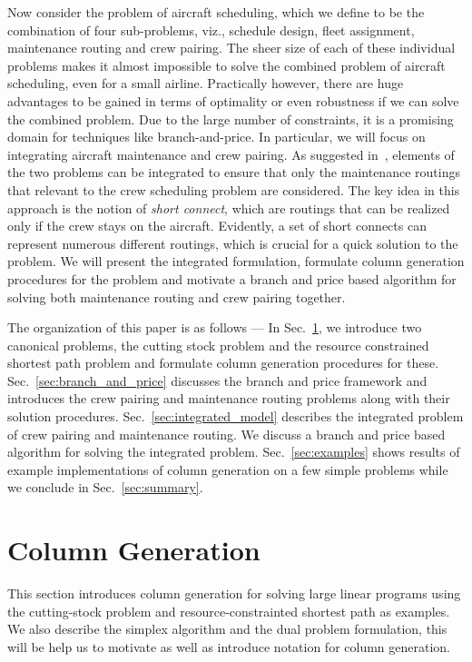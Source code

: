\documentclass[letterpaper, 10pt, twocolumn, reqno]{amsart}
\begin{document}
Now consider the problem of aircraft scheduling, which we define to be the combination of four sub-problems, viz., schedule design, fleet assignment, maintenance routing and crew pairing. The sheer size of each of these individual problems makes it almost impossible to solve the combined problem of aircraft scheduling, even for a small airline. Practically however, there are huge advantages to be gained in terms of optimality or even robustness if we can solve the combined problem. Due to the large number of constraints, it is a promising domain for techniques like branch-and-price. In particular, we will focus on integrating aircraft maintenance and crew pairing. As suggested in~\cite{cohn2003improving}, elements of the two problems can be integrated to ensure that only the maintenance routings that relevant to the crew scheduling problem are considered. The key idea in this approach is the notion of \emph{short connect}, which are routings that can be realized only if the crew stays on the aircraft. Evidently, a set of short connects can represent numerous different routings, which is crucial for a quick solution to the problem. We will present the integrated formulation, formulate column generation procedures for the problem and motivate a branch and price based algorithm for solving both maintenance routing and crew pairing together.

The organization of this paper is as follows --- In Sec.~\ref{sec:column_generation}, we introduce two canonical problems, the cutting stock problem and the resource constrained shortest path problem and formulate column generation procedures for these. Sec.~\ref{sec:branch_and_price} discusses the branch and price framework and introduces the crew pairing and maintenance routing problems along with their solution procedures. Sec.~\ref{sec:integrated_model} describes the integrated problem of crew pairing and maintenance routing. We discuss a branch and price based algorithm for solving the integrated problem. Sec.~\ref{sec:examples} shows results of example implementations of column generation on a few simple problems while we conclude in Sec.~\ref{sec:summary}.

\section{Column Generation}
\label{sec:column_generation}

This section introduces column generation for solving large linear programs using the cutting-stock problem and resource-constrainted shortest path as examples. We also describe the simplex algorithm and the dual problem formulation, this will be help us to motivate as well as introduce notation for column generation.
\end{document}
